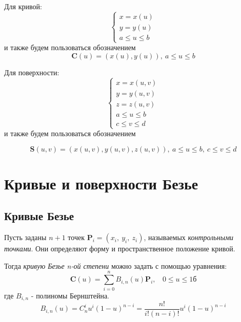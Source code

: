 \documentclass{bmstu}
\begin{document}
Для кривой:
\begin{equation}
    \begin{cases}
        x = x(u) \\
        y = y(u) \\
        a \le u \le b
    \end{cases}
\end{equation}
и также будем пользоваться обозначением
\begin{equation}
    \mathbf{C}(u) = (x(u), y(u)),~        a \le u \le b
\end{equation}

Для поверхности:
\begin{equation}
    \begin{cases}
        x = x(u, v)   \\
        y = y(u, v)   \\
        z = z(u, v)   \\
        a \le u \le b \\
        c \le v \le d
    \end{cases}
\end{equation}
и также будем пользоваться обозначением

\begin{equation}
    \mathbf{S}(u, v) = (x(u, v), y(u, v), z(u, v)),~        a \le u \le b,~c \le v \le d
\end{equation}

\section{Кривые и поверхности Безье}

\subsection{Кривые Безье}

Пусть заданы $n+1$ точек $\mathbf{P}_i = (x_i,~y_i,~z_i)$, называемых \textit{контрольными точками}. Они определяют форму и пространственное положение кривой.

Тогда \textit{кривую Безье n-ой степени} можно задать с помощью уравнения:
\begin{equation}
    \mathbf{C}(u) = \sum\limits_{i=0}^n B_{i, n}(u)\mathbf{P}_i,~~~~ 0\le u\le 1б
\end{equation}
где $B_{i, n}$ - полиномы Бернштейна.
\begin{equation}
    B_{i, n}(u) = C^i_nu^i(1-u)^{n-i} = \frac{n!}{i!(n-i)!}u^i(1-u)^{n-i}
\end{equation}
\end{document}
